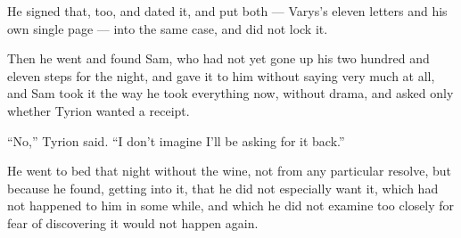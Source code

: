 He signed that, too, and dated it, and put both — Varys’s eleven letters and his own single page — into the same case, and did not lock it.

Then he went and found Sam, who had not yet gone up his two hundred and eleven steps for the night, and gave it to him without saying very much at all, and Sam took it the way he took everything now, without drama, and asked only whether Tyrion wanted a receipt.

“No,” Tyrion said. “I don’t imagine I’ll be asking for it back.”

He went to bed that night without the wine, not from any particular resolve, but because he found, getting into it, that he did not especially want it, which had not happened to him in some while, and which he did not examine too closely for fear of discovering it would not happen again.